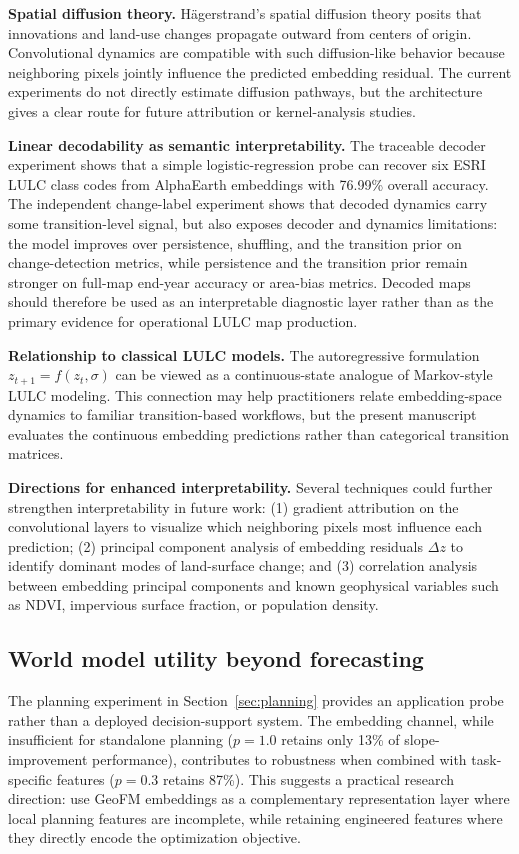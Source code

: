 \documentclass{article}
\begin{document}
\textbf{Spatial diffusion theory.}
H\"{a}gerstrand's spatial diffusion theory posits that innovations and land-use changes propagate outward from centers of origin. Convolutional dynamics are compatible with such diffusion-like behavior because neighboring pixels jointly influence the predicted embedding residual. The current experiments do not directly estimate diffusion pathways, but the architecture gives a clear route for future attribution or kernel-analysis studies.

\textbf{Linear decodability as semantic interpretability.}
The traceable decoder experiment shows that a simple logistic-regression probe can recover six ESRI LULC class codes from AlphaEarth embeddings with 76.99\% overall accuracy. The independent change-label experiment shows that decoded dynamics carry some transition-level signal, but also exposes decoder and dynamics limitations: the model improves over persistence, shuffling, and the transition prior on change-detection metrics, while persistence and the transition prior remain stronger on full-map end-year accuracy or area-bias metrics. Decoded maps should therefore be used as an interpretable diagnostic layer rather than as the primary evidence for operational LULC map production.

\textbf{Relationship to classical LULC models.}
The autoregressive formulation $z_{t+1} = f(z_t, \sigma)$ can be viewed as a continuous-state analogue of Markov-style LULC modeling. This connection may help practitioners relate embedding-space dynamics to familiar transition-based workflows, but the present manuscript evaluates the continuous embedding predictions rather than categorical transition matrices.

\textbf{Directions for enhanced interpretability.}
Several techniques could further strengthen interpretability in future work: (1) gradient attribution on the convolutional layers to visualize which neighboring pixels most influence each prediction; (2) principal component analysis of embedding residuals $\Delta z$ to identify dominant modes of land-surface change; and (3) correlation analysis between embedding principal components and known geophysical variables such as NDVI, impervious surface fraction, or population density.

\subsection{World model utility beyond forecasting}

The planning experiment in Section~\ref{sec:planning} provides an application probe rather than a deployed decision-support system. The embedding channel, while insufficient for standalone planning ($p=1.0$ retains only 13\% of slope-improvement performance), contributes to robustness when combined with task-specific features ($p=0.3$ retains 87\%). This suggests a practical research direction: use GeoFM embeddings as a complementary representation layer where local planning features are incomplete, while retaining engineered features where they directly encode the optimization objective.
\end{document}
